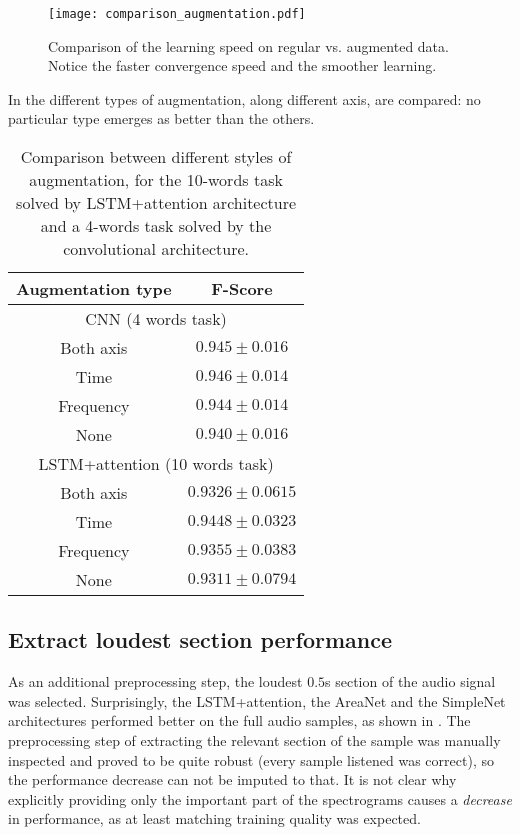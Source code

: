 \begin{figure}[t!]
    \centering
    \texttt{[image: comparison\_augmentation.pdf]}
    \caption{Comparison of the learning speed on regular vs. augmented data.
        Notice the faster convergence speed and the smoother learning.
    }%
    \label{fig:augmentation_learning_speed}
\end{figure}

In  the different types of
augmentation, along different axis, are compared:
no particular type emerges as better than the others.

\begin{table}[t!]
    \centering
    \caption{Comparison between different styles of augmentation,
    for the 10-words task solved by LSTM+attention architecture and a
    4-words task solved by the convolutional architecture.}
    \label{tab:att_augmentation_comparison}
    \begin{tabular}{|c|c|}
        \hline
        Augmentation type & F-Score \\
        \hline
        \hline
        \multicolumn{2}{|c|}{CNN (4 words task)} \\
        \hline
        Both axis & $0.945 \pm 0.016$ \\
        Time      & $0.946 \pm 0.014$ \\
        Frequency & $0.944 \pm 0.014$ \\
        None      & $0.940 \pm 0.016$ \\
        \hline
        \hline
        \multicolumn{2}{|c|}{LSTM+attention (10 words task)} \\
        \hline
        Both axis & $0.9326 \pm 0.0615$ \\
        Time      & $0.9448 \pm 0.0323$ \\
        Frequency & $0.9355 \pm 0.0383$ \\
        None      & $0.9311 \pm 0.0794$ \\
        \hline
    \end{tabular}
\end{table}


\subsection{Extract loudest section performance}

As an additional preprocessing step, the loudest $0.5$s section of the audio
signal was selected.
%
Surprisingly, the LSTM+attention, the AreaNet and the SimpleNet architectures
performed better on the full audio samples, as shown in
.
%
The preprocessing step of extracting the relevant section of the sample was
manually inspected and proved to be quite robust (every sample listened was
correct), so the performance decrease can not be imputed to that.
%
It is not clear why explicitly providing only the important part of the
spectrograms causes a \textit{decrease} in performance, as at least matching
training quality was expected.

